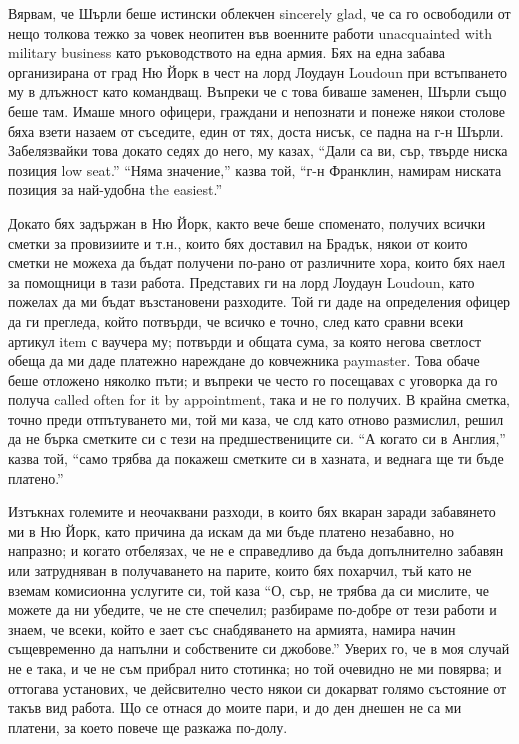\documentclass[12pt]{book}
\begin{document}
Вярвам, че Шърли беше истински облекчен sincerely glad, че са го освободили от нещо толкова тежко за човек неопитен във военните работи unacquainted with military business като ръководството на една армия. Бях на една забава организирана от град Ню Йорк в чест на лорд Лоудаун Loudoun при встъпването му в длъжност като командващ. Въпреки че с това биваше заменен, Шърли също беше там. Имаше много офицери, граждани и непознати и понеже някои столове бяха взети назаем от съседите, един от тях, доста нисък, се падна на г-н Шърли. Забелязвайки това докато седях до него, му казах, “Дали са ви, сър, твърде ниска позиция low seat.” “Няма значение,” казва той, “г-н Франклин, намирам ниската позиция за най-удобна the easiest.”

Докато бях задържан в Ню Йорк, както вече беше споменато, получих всички сметки за провизиите и т.н., които бях доставил на Брадък, някои от които сметки не можеха да бъдат получени по-рано от различните хора, които бях наел за помощници в тази работа. Представих ги на лорд Лоудаун Loudoun, като пожелах да ми бъдат възстановени разходите. Той ги даде на определения офицер да ги прегледа, който потвърди, че всичко е точно, след като сравни всеки артикул item с ваучера му; потвърди и общата сума, за която негова светлост обеща да ми даде платежно нареждане до ковчежника paymaster. Това обаче беше отложено няколко пъти;  и въпреки че често го посещавах с уговорка да го получа called often for it by appointment, така и не го получих. В крайна сметка, точно преди отпътуването ми, той ми каза, че слд като отново размислил, решил да не бърка сметките си с тези на предшествениците си. “А когато си в Англия,” казва той, “само трябва да покажеш сметките си в хазната, и веднага ще ти бъде платено.”

Изтъкнах големите и неочаквани разходи, в които бях вкаран заради забавянето ми в Ню Йорк, като причина да искам да ми бъде платено незабавно, но напразно; и когато отбелязах, че не е справедливо да бъда допълнително забавян или затрудняван в получаването на парите, които бях похарчил, тъй като не вземам комисионна услугите си, той каза “О, сър, не трябва да си мислите, че можете да ни убедите, че не сте спечелил; разбираме по-добре от тези работи и знаем, че всеки, който е зает със снабдяването на армията, намира начин същевременно да напълни и собствените си джобове.” Уверих го, че в моя случай не е така, и че не съм прибрал нито стотинка; но той очевидно не ми повярва; и оттогава установих, че дейсвително често някои си докарват голямо състояние от такъв вид работа. Що се отнася до моите пари, и до ден днешен не са ми платени, за което повече ще разкажа по-долу.
\end{document}

